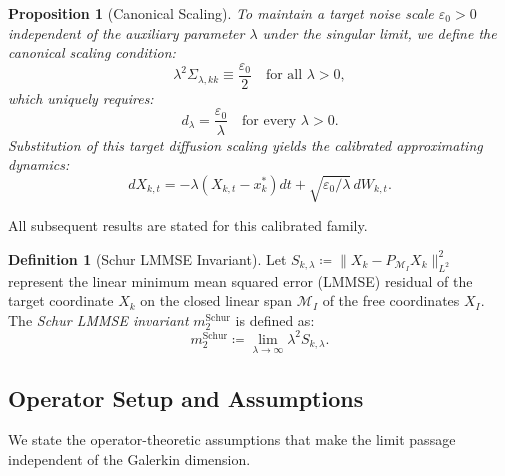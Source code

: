 \documentclass[11pt]{amsart}
\theoremstyle{plain}
\newtheorem{proposition}[theorem]{Proposition}
\theoremstyle{definition}
\newtheorem{definition}[theorem]{Definition}
\theoremstyle{remark}
\begin{document}
\begin{proposition}[Canonical Scaling]
  \label{prop:exact_calibration}
  To maintain a target noise scale $\varepsilon_0 > 0$ independent of the auxiliary parameter $\lambda$ under the singular limit, we define the canonical scaling condition:
  \begin{equation}
    \lambda^2 \Sigma_{\lambda,kk} \equiv \frac{\varepsilon_0}{2} \quad \text{for all } \lambda > 0,
  \end{equation}
  which uniquely requires:
  \begin{equation}
    d_\lambda = \frac{\varepsilon_0}{\lambda} \quad \text{for every } \lambda > 0.
  \end{equation}
  Substitution of this target diffusion scaling yields the calibrated approximating dynamics:
  \begin{equation}
    dX_{k,t} = -\lambda (X_{k,t} - x_k^*) dt + \sqrt{\varepsilon_0 / \lambda}\, dW_{k,t}.
  \end{equation}
\end{proposition}

All subsequent results are stated for this calibrated family.

\begin{definition}[Schur LMMSE Invariant]
  \label{def:schur_invariant}
  Let $S_{k,\lambda} \coloneqq \|X_k - P_{\mathcal{M}_I} X_k\|_{L^2}^2$ represent the linear minimum mean squared error (LMMSE) residual of the target coordinate $X_k$ on the closed linear span $\mathcal{M}_I$ of the free coordinates $X_I$. The \emph{Schur LMMSE invariant} $m_2^{\mathrm{Schur}}$ is defined as:
  \begin{equation}
    \label{eq:m2_schur_definition}
    m_2^{\mathrm{Schur}} \coloneqq \lim_{\lambda\to\infty} \lambda^2 S_{k,\lambda}.
  \end{equation}
\end{definition}

\subsection{Operator Setup and Assumptions}
\label{sec:setup:assumptions}

We state the operator-theoretic assumptions that make the limit passage independent of the Galerkin dimension.
\end{document}
